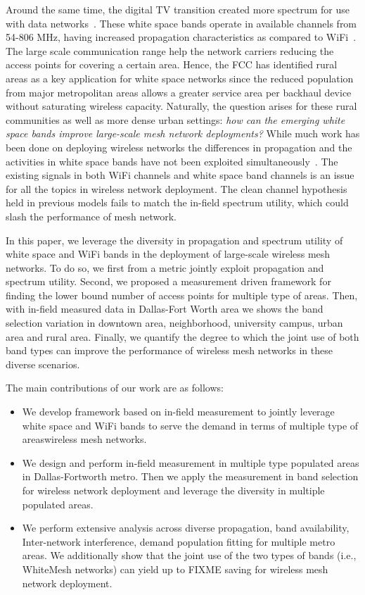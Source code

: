 Around the same time, the digital TV transition created more
spectrum for use with data networks~\cite{fccwhitespace}. These white 
space bands operate in available channels from 54-806 MHz, having
increased propagation characteristics as compared to 
WiFi~\cite{balanis2012antenna}. The large scale communication range 
help the network carriers reducing the access points for covering a 
certain area. Hence, the FCC has identified rural
areas as a key application for white space networks since the reduced
population from major metropolitan areas allows a greater service area
per backhaul device without saturating wireless capacity. 
Naturally, the question arises for these rural communities as well as more dense 
urban settings: {\it how can the emerging white space bands improve 
large-scale mesh network deployments?} 
While much work has been done on deploying wireless networks
the differences in propagation and the activities in white space bands
have not been exploited simultaneously~\cite{si2010overview}.
The existing signals in both WiFi channels and white space band channels 
is an issue for all the topics in wireless network deployment.
The clean channel hypothesis held in previous models fails to match the
in-field spectrum utility, which could slash the performance of mesh 
network.

In this paper, we leverage the diversity in propagation and spectrum utility 
of white space and WiFi bands in the deployment of large-scale
 wireless mesh networks. 
 To do so, we first from a metric jointly exploit propagation and 
 spectrum utility. Second, we proposed a measurement driven framework 
 for finding the lower bound number of access points for multiple type of
 areas. Then, with in-field measured data in Dallas-Fort Worth area
  we shows the band selection variation in downtown area, neighborhood, 
  university campus, urban area and rural area.
Finally, we quantify the degree to which the joint use of both band types can improve the 
performance of wireless mesh networks in these diverse scenarios.

The main contributions of our work are as follows:
\begin{itemize}
\item We develop framework based on in-field measurement to jointly leverage white space and
 WiFi bands to serve the demand in terms of multiple type of areaswireless mesh networks.  
\item We design and perform in-field measurement in multiple type populated areas in 
Dallas-Fortworth metro. Then we apply the measurement in band selection for wireless network
deployment and leverage the diversity in multiple populated areas.
\item We perform extensive analysis across diverse propagation, band availability, Inter-network interference,
demand population fitting for multiple metro areas. 
We additionally show that the joint use of the two types of bands (i.e., WhiteMesh 
networks) can yield up to FIXME saving for wireless mesh network deployment.
\end{itemize}


